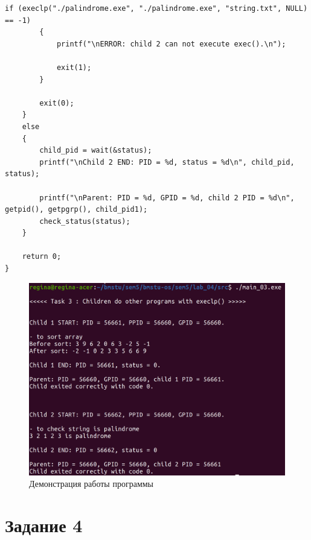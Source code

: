\begin{center}
\begin{lstlisting}[label=lst:exec,caption=Системный вызов execlp]
        if (execlp("./palindrome.exe", "./palindrome.exe", "string.txt", NULL) == -1)
        {
            printf("\nERROR: child 2 can not execute exec().\n");

            exit(1);
        }

        exit(0);
    }
    else
    {
        child_pid = wait(&status);
        printf("\nChild 2 END: PID = %d, status = %d\n", child_pid, status);

        printf("\nParent: PID = %d, GPID = %d, child 2 PID = %d\n", getpid(), getpgrp(), child_pid1);
        check_status(status);
    }

    return 0;
}
\end{lstlisting}
\end{center}

\begin{figure}[H]
	\begin{center}
		\includegraphics[scale=0.3]{inc/exec.png}
	\end{center}
	\captionsetup{justification=centering}
	\caption{Демонстрация работы программы}
	\label{img:exec}
\end{figure}

\section*{Задание 4}


